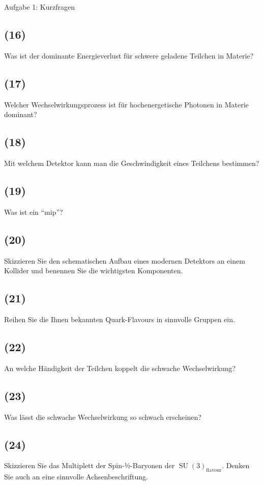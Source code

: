 \begin{aufgabe}{Aufgabe 1: Kurzfragen}
    \subsection{(16)}
    Was ist der dominante Energieverlust für schwere geladene Teilchen in Materie?

    \subsection{(17)}
    Welcher Wechselwirkungsprozess ist für hochenergetische Photonen in Materie dominant?

    \subsection{(18)}
    Mit welchem Detektor kann man die Geschwindigkeit eines Teilchens bestimmen?

    \subsection{(19)}
    Was ist ein \enquote{mip}?

    \subsection{(20)}
    Skizzieren Sie den schematischen Aufbau eines modernen Detektors an einem Kollider
    und benennen Sie die wichtigsten Komponenten.

    \subsection{(21)}
    Reihen Sie die Ihnen bekannten Quark-Flavours in sinnvolle Gruppen ein.

    \subsection{(22)}
    An welche Händigkeit der Teilchen koppelt die schwache Wechselwirkung?

    \subsection{(23)}
    Was lässt die schwache Wechselwirkung so schwach erscheinen?

    \subsection{(24)}
    Skizzieren Sie das Multiplett der Spin-½-Baryonen der $\operatorname{SU}(3)_\text{flavour}$.
    Denken Sie auch an eine sinnvolle Achsenbeschriftung.


\end{aufgabe}

